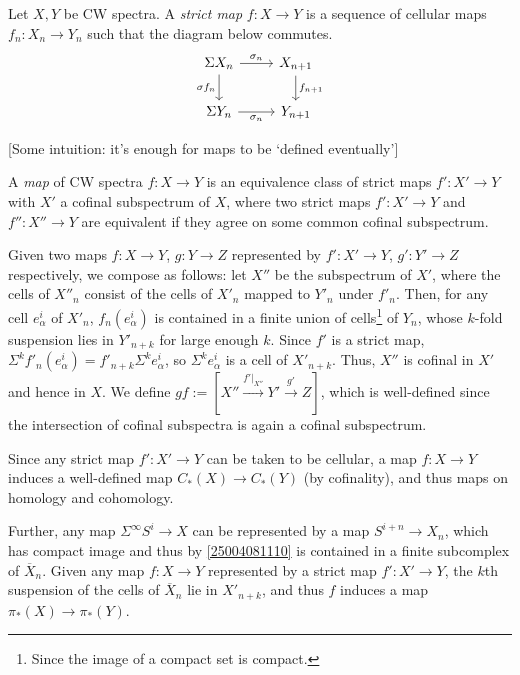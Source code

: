 \documentclass{MetricNotes2023}
\def\SIgma{\ensuremath\Sigma}
\def\textcolour{\textcolor}
\begin{document}
\begin{definition}
Let \(X, Y\) be CW spectra. A \textit{strict map} \(f : X \to Y\) is a sequence of cellular maps \(f_n : X_n \to Y_n\) such that the diagram below commutes.
\[\begin{tikzcd}
\Sigma X_n \arrow[r, "\sigma_n"] \arrow[d, swap, "\sigma f_n"]  & X_{n+1} \arrow[d, "f_{n+1}"]  \\
\SIgma Y_n \arrow[r, swap, "\sigma_n"]  & Y_{n+1}
\end{tikzcd}\]
\end{definition}


[Some intuition: it's enough for maps to be `defined eventually']

\begin{definition}
A \textit{map} of CW spectra \(f : X \to Y\) is an equivalence class of strict maps \(f' : X' \to Y\) with \(X'\) a cofinal subspectrum of \(X\), where two strict maps \(f' : X' \to Y\) and \(f'' : X'' \to Y\) are equivalent if they agree on some common cofinal subspectrum. 
\end{definition}

Given two maps \(f : X \to Y\), \(g : Y \to Z\) represented by \(f' : X' \to Y\), \(g' : Y' \to Z\) respectively, we compose as follows: let \(X''\) be the subspectrum of \(X'\), where the cells of \(X''_n\) consist of the cells of \(X'_n\) mapped to \(Y'_n\) under \(f'_n\). Then, for any cell \(e^i_\alpha\) of \(X'_n\), \(f_n(e^i_\alpha)\) is contained in a finite union of cells\footnote{Since the image of a compact set is compact.} of \(Y_n\), whose \(k\)-fold suspension lies in \(Y'_{n+k}\) for large enough \(k\). Since \(f'\) is a strict map, \(\Sigma^kf'_n(e^i_\alpha)=f'_{n+k}\Sigma^ke^i_\alpha\), so \(\Sigma^ke^i_\alpha\) is a cell of \(X'_{n+k}\). Thus, \(X''\) is cofinal in \(X'\) and hence in \(X\). We define \(gf := [X'' \xrightarrow{f'|_{X''}}Y' \xrightarrow{g'}Z]\), which is well-defined since the intersection of cofinal subspectra is again a cofinal subspectrum. 

Since any strict map \(f' : X' \to Y\) can be taken to be cellular, a map \(f : X \to Y\) induces a well-defined map \(C_*(X)\to C_*(Y)\) (by cofinality), and thus maps on homology and cohomology. 

Further, any map \(\Sigma^\infty S^i \to X\) can be represented by a map \(S^{i+n}\to X_n\), which has compact image and thus by \ref{25004081110} is contained in a finite subcomplex of \(\overline X_n\). Given any map \(f : X \to Y\) represented by a strict map \(f' : X' \to Y\), the \(k\)th suspension of the cells of \(\overline X_n\) lie in \(X'_{n+k}\), and thus \(f\) induces a map \(\pi_*(X) \to \pi_*(Y)\). %
\end{document}
